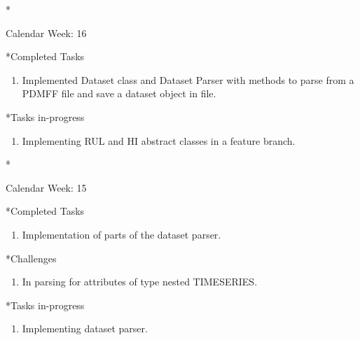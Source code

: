 \documentclass[11pt,a4paper]{article}
\begin{document}
\newpage
\begin{section}*{Calendar Week: 16  \hfill \date{23 April, 2021}}
 \begin{refsection}
     \begin{subsection}*{Completed Tasks}
         \begin{enumerate}
             \item Implemented Dataset class and Dataset Parser with methods to parse from a PDMFF file and save a dataset object in file.
         \end{enumerate}
     \end{subsection}
     \begin{subsection}*{Tasks in-progress}
         \begin{enumerate}
             \item Implementing RUL and HI abstract classes in a feature branch.
         \end{enumerate}
     \end{subsection}
 \end{refsection}
\end{section}

\newpage
\begin{section}*{Calendar Week: 15  \hfill \date{16 April, 2021}}
 \begin{refsection}
     \begin{subsection}*{Completed Tasks}
         \begin{enumerate}
             \item Implementation of parts of the dataset parser.
         \end{enumerate}
     \end{subsection}
     \begin{subsection}*{Challenges}
         \begin{enumerate}
             \item In parsing for attributes of type nested TIMESERIES.
         \end{enumerate}
     \end{subsection}
     \begin{subsection}*{Tasks in-progress}
         \begin{enumerate}
             \item Implementing dataset parser.
         \end{enumerate}
     \end{subsection}
 \end{refsection}
\end{section}
\end{document}
